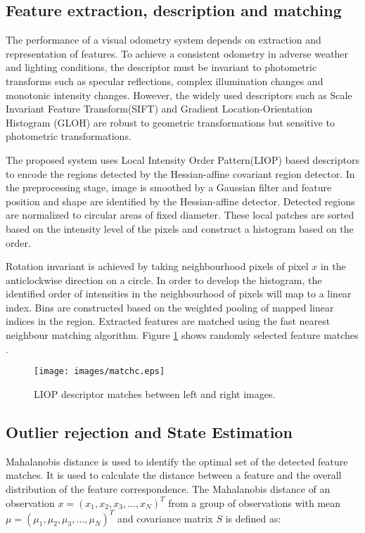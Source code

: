 \documentclass{article}
\begin{document}
\subsection{Feature extraction, description and matching }
The performance of a visual odometry system  depends on extraction and representation of features. To achieve a consistent odometry in adverse weather and lighting conditions, the descriptor must be invariant to photometric transforms such as  specular reflections, complex illumination changes and monotonic intensity changes.
However, the widely used descriptors such as Scale Invariant Feature Transform(SIFT) and Gradient Location-Orientation Histogram (GLOH) are robust to geometric transformations but sensitive to  photometric transformations.
\par
The proposed system uses  Local Intensity Order Pattern(LIOP)\cite{wang2011local} based descriptors to encode  the regions detected by the Hessian-affine covariant region detector. In the preprocessing stage, image is smoothed by a Gaussian filter and feature position and shape are identified by the Hessian-affine detector\cite{mikolajczyk2002affine}. Detected regions are normalized to circular areas of fixed diameter. These local patches are sorted based on the intensity level of the pixels and construct a histogram based on the order. 

\par
Rotation invariant is achieved by taking neighbourhood pixels of pixel $x$ in the anticlockwise direction on a circle. In order to develop  the histogram, the identified order of intensities in the neighbourhood  of pixels will map to a linear index. Bins are constructed based on the weighted pooling of mapped linear indices  in the region. Extracted features are matched using the fast nearest neighbour matching algorithm. Figure \ref{match} shows randomly selected feature matches .

\begin{figure}[ht]
 \centering
 \texttt{[image: images/matchc.eps]}
\caption{LIOP descriptor matches between  left and right images.}
\label{match}
\end{figure}
\subsection{Outlier rejection and State Estimation}
Mahalanobis distance is used to identify the optimal set of the detected feature matches. It is used to calculate the distance between a feature and the overall distribution of the feature correspondence. The Mahalanobis distance \cite{de2000mahalanobis} of an observation $x = ( x_1, x_2, x_3, \dots, x_N )^T$ from a group of observations with mean $\mu = ( \mu_1, \mu_2, \mu_3, \dots , \mu_N )^T$ and covariance matrix $S$ is defined as:
\end{document}
